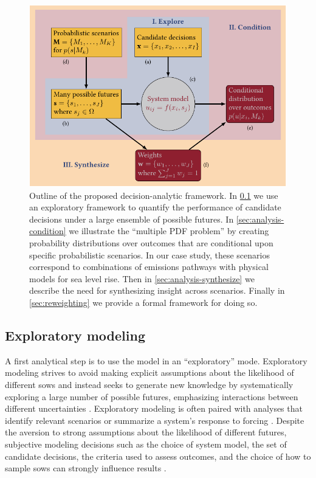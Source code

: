 \documentclass{agujournal2019}
\begin{document}
\begin{figure}
  \centering
  \includegraphics[width=\textwidth]{bayes-rdm.pdf}
  \caption{
    Outline of the proposed decision-analytic framework.
    In \cref{sec:analysis-explore} we use an exploratory framework to quantify the performance of candidate decisions under a large ensemble of possible futures.
    In \cref{sec:analysis-condition} we illustrate the ``multiple PDF problem'' by creating probability distributions over outcomes that are conditional upon specific probabilistic scenarios.
    In our case study, these scenarios correspond to combinations of emissions pathways with physical models for sea level rise.
    Then in \cref{sec:analysis-synthesize} we describe the need for synthesizing insight across scenarios.
    Finally in \cref{sec:reweighting} we provide a formal framework for doing so.
  }\label{fig:flowchart}
\end{figure}

\subsection{Exploratory modeling}\label{sec:analysis-explore}

A first analytical step is to use the model in an ``exploratory'' mode.
Exploratory modeling strives to avoid making explicit assumptions about the likelihood of different \glspl{sow} and instead seeks to generate new knowledge \cite{bankes:1993} by systematically exploring a large number of possible futures, emphasizing interactions between different uncertainties \cite{reed_msdbook:2022}.
Exploratory modeling is often paired with analyses that identify relevant scenarios  \cite{lamontagne_discovery:2018,groves_scenarios:2007} or summarize a system's response to forcing \cite{Poff:2015jn,Steinschneider:2015kk,sriver_sealevel:2018}.
Despite the aversion to strong assumptions about the likelihood of different futures, subjective modeling decisions such as the choice of system model, the set of candidate decisions, the criteria used to assess outcomes, and the choice of how to sample \glspl{sow} can strongly influence results \cite{quinn_exploratory:2020,quinn_rivalframings:2017,moallemi_decisionsupport:2020}.
\end{document}
